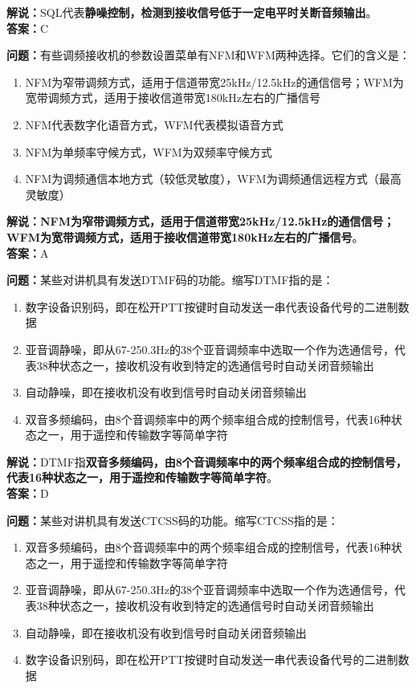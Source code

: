 \documentclass{ctexbook}
\begin{document}
\noindent\textbf{解说：}SQL代表\textbf{静噪控制，检测到接收信号低于一定电平时关断音频输出}。\\\noindent\textbf{答案：}C


\bigskip


\noindent\textbf{问题：}有些调频接收机的参数设置菜单有NFM和WFM两种选择。它们的含义是：

\begin{enumerate}[label=\Alph*), leftmargin=3em]
	\item NFM为窄带调频方式，适用于信道带宽25kHz/12.5kHz的通信信号；WFM为宽带调频方式，适用于接收信道带宽180kHz左右的广播信号
	\item NFM代表数字化语音方式，WFM代表模拟语音方式
	\item NFM为单频率守候方式，WFM为双频率守候方式
	\item NFM为调频通信本地方式（较低灵敏度），WFM为调频通信远程方式（最高灵敏度）
\end{enumerate}

\noindent\textbf{解说：NFM为窄带调频方式，适用于信道带宽25kHz/12.5kHz的通信信号；WFM为宽带调频方式，适用于接收信道带宽180kHz左右的广播信号}。\\\noindent\textbf{答案：}A


\bigskip


\noindent\textbf{问题：}某些对讲机具有发送DTMF码的功能。缩写DTMF指的是：

\begin{enumerate}[label=\Alph*), leftmargin=3em]
	\item 数字设备识别码，即在松开PTT按键时自动发送一串代表设备代号的二进制数据
	\item 亚音调静噪，即从67-250.3Hz的38个亚音调频率中选取一个作为选通信号，代表38种状态之一，接收机没有收到特定的选通信号时自动关闭音频输出	
	\item 自动静噪，即在接收机没有收到信号时自动关闭音频输出
	\item 双音多频编码，由8个音调频率中的两个频率组合成的控制信号，代表16种状态之一，用于遥控和传输数字等简单字符
\end{enumerate}

\noindent\textbf{解说：}DTMF指\textbf{双音多频编码，由8个音调频率中的两个频率组合成的控制信号，代表16种状态之一，用于遥控和传输数字等简单字符}。\\\noindent\textbf{答案：}D


\bigskip


\noindent\textbf{问题：}某些对讲机具有发送CTCSS码的功能。缩写CTCSS指的是：

\begin{enumerate}[label=\Alph*), leftmargin=3em]
	\item 双音多频编码，由8个音调频率中的两个频率组合成的控制信号，代表16种状态之一，用于遥控和传输数字等简单字符
	\item 亚音调静噪，即从67-250.3Hz的38个亚音调频率中选取一个作为选通信号，代表38种状态之一，接收机没有收到特定的选通信号时自动关闭音频输出
	\item 自动静噪，即在接收机没有收到信号时自动关闭音频输出
	\item 数字设备识别码，即在松开PTT按键时自动发送一串代表设备代号的二进制数据
\end{enumerate}
\end{document}
